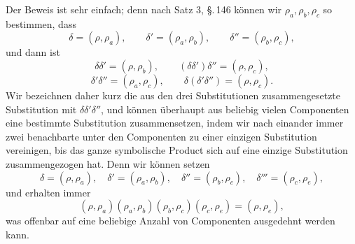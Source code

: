 \documentclass[11pt]{article}
\begin{document}
Der Beweis ist sehr einfach; denn nach Satz 3, §.\,146 können wir $\rho_a,\rho_b,\rho_c$ so bestimmen, dass
\[
\tag{4}
        \delta=(\rho,\rho_a),\qquad
        \delta'=(\rho_a,\rho_b),\qquad
        \delta''=(\rho_b,\rho_c),
\]
und dann ist
\[
\delta\delta'=(\rho,\rho_b),\qquad
(\delta\delta')\delta''=(\rho,\rho_c),
\]
\[
\delta'\delta''=(\rho_a,\rho_c),\qquad
\delta(\delta'\delta'')=(\rho,\rho_c).
\]
Wir bezeichnen daher kurz die aus den drei Substitutionen zusammengesetzte Substitution mit $\delta\delta'\delta''$, und können überhaupt aus beliebig vielen Componenten eine bestimmte Substitution zusammensetzen, indem wir nach einander immer zwei benachbarte unter den Componenten zu einer einzigen Substitution vereinigen, bis das ganze symbolische Product sich auf eine einzige Substitution zusammengezogen hat. Denn wir können setzen
\[
        \delta=(\rho,\rho_a),\quad
        \delta'=(\rho_a,\rho_b),\quad
        \delta''=(\rho_b,\rho_c),\quad
        \delta'''=(\rho_c,\rho_e),
\]
und erhalten immer
\[
        (\rho,\rho_a)(\rho_a,\rho_b)(\rho_b,\rho_c)(\rho_c,\rho_e)
        =(\rho,\rho_e),
\]
was offenbar auf eine beliebige Anzahl von Componenten ausgedehnt werden kann.
\end{document}

